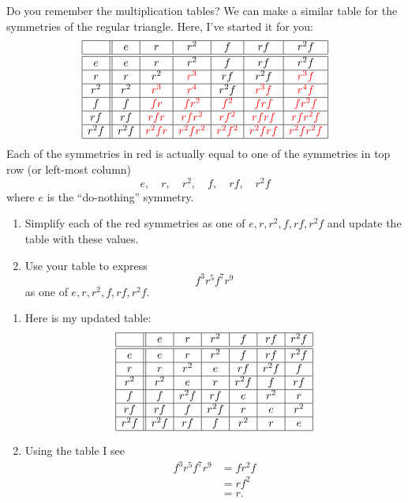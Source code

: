 \documentclass[noauthor,nooutcomes,hints,handout]{ximera}
\begin{document}
\begin{question}
  Do you remember the multiplication tables? We can make a similar
  table for the symmetries of the regular triangle. Here, I've
  started it for you:
  \[
  \begin{array}{|c||c|c|c|c|c|c|}
    \hline
      & e & r & r^2 & f & rf & r^2f\\ \hline\hline
    e & e & r & r^2 & f & rf & r^2f\\ \hline
    r & r & r^2 & \color{red}r^3 & rf & r^2f & \color{red}r^3f\\ \hline
    r^2 & r^2 & \color{red}r^3 & \color{red}r^4 & r^2f & \color{red}r^3f &\color{red} r^4f\\ \hline
    f  & f & \color{red}fr & \color{red}fr^2 & \color{red}f^2 & \color{red}frf & \color{red}fr^2f\\ \hline
    rf & rf & \color{red}rfr & \color{red}rfr^2 & \color{red}rf^2 & \color{red}rfrf & \color{red}rfr^2f\\ \hline
    r^2f & r^2f & \color{red}r^2fr & \color{red}r^2fr^2 & \color{red}r^2f^2 &\color{red} r^2frf &\color{red} r^2fr^2f\\ \hline
  \end{array}
  \]
  Each of the symmetries in red is actually equal to one of the
  symmetries in top row (or left-most column)
  \[
  e,\quad r,\quad r^2,\quad f,\quad rf,\quad r^2f
  \]
  where $e$ is the ``do-nothing'' symmetry.
  \begin{enumerate}
    \item Simplify each of the red symmetries as one of
      $e,r,r^2,f,rf,r^2f$ and update the table with these values.
    \item Use your table to express
      \[
      f^3r^5f^7r^9
      \]
      as one of $e,r,r^2,f,rf,r^2f$.
  \end{enumerate}
  \begin{freeResponse}
      \begin{enumerate}
      \item
      Here is my updated table:
       \[
  \begin{array}{|c||c|c|c|c|c|c|}
    \hline
    & e & r & r^2 & f & rf & r^2f\\ \hline\hline
    e & e & r & r^2 & f & rf & r^2f\\ \hline
    r & r & r^2 & e & rf & r^2f & f\\ \hline
    r^2 & r^2 & e & r & r^2f & f &rf\\ \hline
    f  & f & r^2f & rf & e & r^2 & r\\ \hline
    rf & rf & f & r^2f & r & e & r^2\\ \hline
    r^2f & r^2f & rf & f & r^2 & r & e\\ \hline
  \end{array}
  \]
\item Using the table I see
  \begin{align*}
    f^3r^5f^7r^9 &= fr^2f\\
    &= rf^2\\
    &= r.
  \end{align*}
    \end{enumerate}
  \end{freeResponse}
\end{question}
\end{document}

